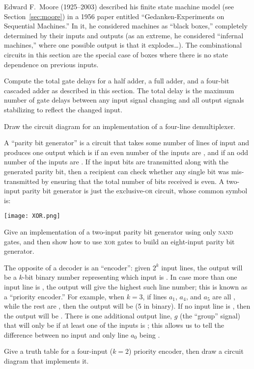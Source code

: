 \begin{tailquote}
Edward F.~Moore (1925--2003) described his finite state machine model (see Section~\ref{sec:moore}) in a 1956 paper entitled ``Gedanken-Experiments on Sequential Machines.'' In it, he considered machines as ``black boxes,'' completely determined by their inputs and outputs (as an extreme, he considered ``infernal machines,'' where one possible output is that it explodes\ldots). The combinational circuits in this section are the special case of boxes where there is no state dependence on previous inputs.
\end{tailquote}
\begin{exercises}
\item\label{ex:cascade} Compute the total gate delays for a half adder, a full adder, and a four-bit cascaded adder as described in this section. The total delay is the maximum number of gate delays between any input signal changing and all output signals stabilizing to reflect the changed input.

\item Draw the circuit diagram for an implementation of a four-line demultiplexer.

\item A ``parity bit generator'' is a circuit that takes some number of lines of input and produces one output which is \0 if an even number of the inputs are \1, and \1 if an odd number of the inputs are \1. If the input bits are transmitted along with the generated parity bit, then a recipient can check whether any single bit was mis-transmitted by ensuring that the total number of \1 bits received is even. A two-input parity bit generator is just the exclusive-\textsc{or} circuit, whose common symbol is:
\begin{center}
\texttt{[image: XOR.png]}
\end{center}
Give an implementation of a two-input parity bit generator using only \textsc{nand} gates, and then show how to use \textsc{xor} gates to build an eight-input parity bit generator.

\item The opposite of a decoder is an ``encoder'': given $2^k$ input lines, the output will be a $k$-bit binary number representing which input is \1. In case more than one input line is \1, the output will give the highest such line number; this is known as a ``priority encoder.'' For example, when $k=3$, if lines $a_1$, $a_4$, and $a_5$ are all \1, while the rest are \0, then the output will be \1\0\1 (5 in binary). If no input line is \1, then the output will be \0\0\0. There is one additional output line, $g$ (the ``group'' signal) that will only be \1 if at least one of the inputs is \1; this allows us to tell the difference between no input and only line $a_0$ being \1.

Give a truth table for a four-input ($k=2$) priority encoder, then draw a circuit diagram that implements it.
\end{exercises}

